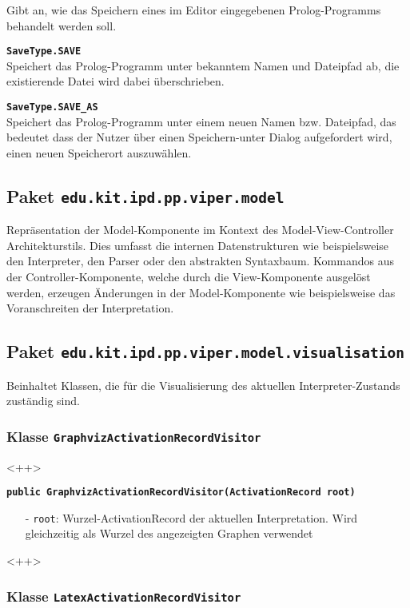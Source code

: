 \documentclass[parskip=full,11pt,twoside]{scrartcl}
\begin{document}
Gibt an, wie das Speichern eines im Editor eingegebenen Prolog-Programms behandelt werden soll.

\textbf{\texttt{SaveType.SAVE}}\\
Speichert das Prolog-Programm unter bekanntem Namen und Dateipfad ab, die existierende Datei wird dabei überschrieben.

\textbf{\texttt{SaveType.SAVE\_AS}}\\
Speichert das Prolog-Programm unter einem neuen Namen bzw. Dateipfad, das bedeutet dass der Nutzer über einen Speichern-unter Dialog aufgefordert wird, einen neuen Speicherort auszuwählen.

\subsection{Paket \texttt{edu.kit.ipd.pp.viper.model}}

Repräsentation der Model-Komponente im Kontext des Model-View-Controller Architekturstils. Dies umfasst die internen Datenstrukturen wie beispielsweise den Interpreter, den Parser oder den abstrakten Syntaxbaum. Kommandos aus der Controller-Komponente, welche durch die View-Komponente ausgelöst werden, erzeugen Änderungen in der Model-Komponente wie beispielsweise das Voranschreiten der Interpretation.

\subsection{Paket \texttt{edu.kit.ipd.pp.viper.model.visualisation}}

Beinhaltet Klassen, die für die Visualisierung des aktuellen Interpreter-Zustands zuständig sind.

\subsubsection{Klasse \texttt{GraphvizActivationRecordVisitor}}

<++>

\textbf{\texttt{public GraphvizActivationRecordVisitor(ActivationRecord root)}}
\begin{itemize}[noitemsep]
	\item[-] \texttt{root}: Wurzel-ActivationRecord der aktuellen Interpretation. Wird gleichzeitig als Wurzel des angezeigten Graphen verwendet
\end{itemize}
<++>

\subsubsection{Klasse \texttt{LatexActivationRecordVisitor}}
\end{document}
